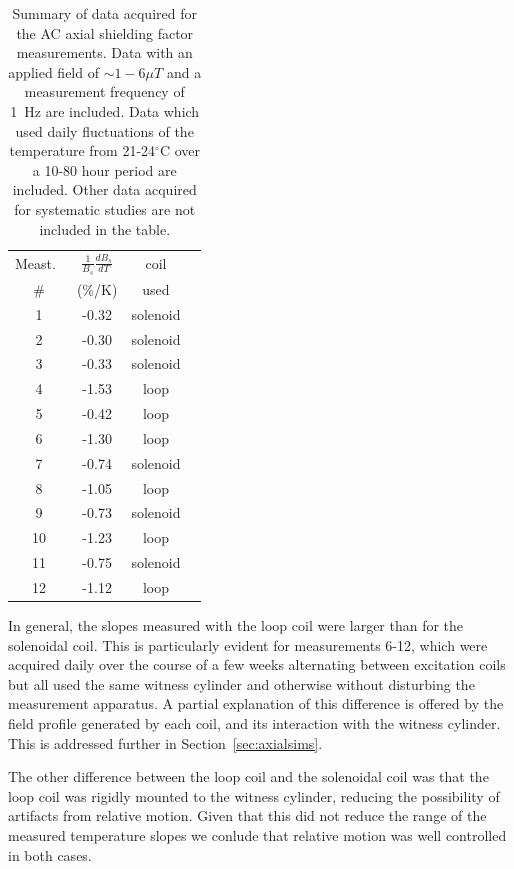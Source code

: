 \begin{table}
\begin{center}
\begin{tabular}{cccc}
Meast.\ & $\frac{1}{B_s}\frac{dB_s}{dT}$ & coil \\
\#    & (\%/K) & used \\\hline
 1 & -0.32 & solenoid \\
 2 & -0.30 & solenoid \\
 3 & -0.33 & solenoid \\
 4 & -1.53 & loop \\
 5 & -0.42 & loop \\
 6 & -1.30 & loop \\
 7 & -0.74 & solenoid \\
 8 & -1.05 & loop \\
 9 & -0.73 & solenoid \\
10 & -1.23 & loop \\
11 & -0.75 & solenoid \\
12 & -1.12 & loop \\
\end{tabular}
\caption{Summary of data acquired for the AC axial shielding factor
  measurements.  Data with an applied field of $\sim 1-6\mu T$ and a
  measurement frequency of 1~Hz are included.  Data which used daily
  fluctuations of the temperature from 21-24$^\circ$C over a 10-80
  hour period are included.  Other data acquired for systematic
  studies are not included in the table.\label{tab:axial}}
\end{center}
\end{table}

In general, the slopes measured with the loop coil were larger than
for the solenoidal coil.  This is particularly evident for
measurements 6-12, which were acquired daily over the course of a few
weeks alternating between excitation coils but all used the same
witness cylinder and otherwise without disturbing the measurement
apparatus.  A partial explanation of this difference is offered by the
field profile generated by each coil, and its interaction with the
witness cylinder.  This is addressed further in
Section~\ref{sec:axialsims}.

The other difference between the loop coil and the solenoidal coil was
that the loop coil was rigidly mounted to the witness cylinder,
reducing the possibility of artifacts from relative motion.  Given
that this did not reduce the range of the measured temperature slopes
we conlude that relative motion was well controlled in both cases.

